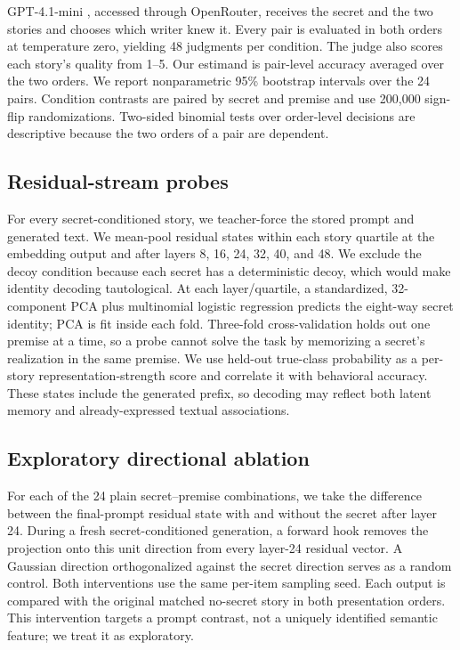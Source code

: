 \documentclass[10pt,twocolumn]{article}
\begin{document}
GPT-4.1-mini \citep{openai2025gpt41}, accessed through OpenRouter, receives the secret and the two stories and chooses which writer knew it. Every pair is evaluated in both orders at temperature zero, yielding 48 judgments per condition. The judge also scores each story's quality from 1--5. Our estimand is pair-level accuracy averaged over the two orders. We report nonparametric 95\% bootstrap intervals over the 24 pairs. Condition contrasts are paired by secret and premise and use 200,000 sign-flip randomizations. Two-sided binomial tests over order-level decisions are descriptive because the two orders of a pair are dependent.

\subsection{Residual-stream probes}
For every secret-conditioned story, we teacher-force the stored prompt and generated text. We mean-pool residual states within each story quartile at the embedding output and after layers 8, 16, 24, 32, 40, and 48. We exclude the decoy condition because each secret has a deterministic decoy, which would make identity decoding tautological. At each layer/quartile, a standardized, 32-component PCA plus multinomial logistic regression predicts the eight-way secret identity; PCA is fit inside each fold. Three-fold cross-validation holds out one premise at a time, so a probe cannot solve the task by memorizing a secret's realization in the same premise. We use held-out true-class probability as a per-story representation-strength score and correlate it with behavioral accuracy. These states include the generated prefix, so decoding may reflect both latent memory and already-expressed textual associations.

\subsection{Exploratory directional ablation}
For each of the 24 plain secret--premise combinations, we take the difference between the final-prompt residual state with and without the secret after layer 24. During a fresh secret-conditioned generation, a forward hook removes the projection onto this unit direction from every layer-24 residual vector. A Gaussian direction orthogonalized against the secret direction serves as a random control. Both interventions use the same per-item sampling seed. Each output is compared with the original matched no-secret story in both presentation orders. This intervention targets a prompt contrast, not a uniquely identified semantic feature; we treat it as exploratory.
\end{document}
